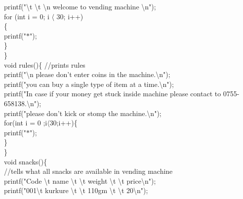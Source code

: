 \documentclass[10pt,a4paper]{article}
\begin{document}
\begin{flushleft}
    \hspace*{0.5cm}  printf("\textbackslash t \textbackslash t \textbackslash n welcome to vending machine \textbackslash n");\\
    \hspace*{0.5cm}  for (int i = 0; i $\langle$ 30; i++)\\
    \hspace*{0.5cm}  \{\\
    \hspace*{0.5cm}  \hspace*{0.5cm}    printf("$\ast$");\\
    \hspace*{0.5cm}  \}\\
\}\\
void rules()\{    //prints rules \\
    \hspace*{0.5cm}  printf("\textbackslash n please don't enter coins in the machine.\textbackslash n");\\
    \hspace*{0.5cm} printf("you can buy a single type of item at a time.\textbackslash n");\\
    \hspace*{0.5cm}  printf("In case if your money get stuck inside machine please contact to 0755-658138.\textbackslash n");\\
    \hspace*{0.5cm}  printf("please don't kick or stomp the machine.\textbackslash n");\\
    \hspace*{0.5cm}  for(int i = 0 ;i$\langle$30;i++)\{\\
    \hspace*{0.5cm}  \hspace*{0.5cm}   printf("$\ast$");\\
    \hspace*{0.5cm}  \}\\
\}\\
void snacks()\{\\    //tells what all snacks are available in vending machine\\
    \hspace*{0.5cm}  printf("Code \textbackslash t name \textbackslash t \textbackslash t weight \textbackslash t \textbackslash t price\textbackslash n");\\
    \hspace*{0.5cm}  printf("001\textbackslash t kurkure \textbackslash t \textbackslash t 110gm \textbackslash t \textbackslash t 20\textbackslash n");\\

\end{flushleft}
\end{document}
